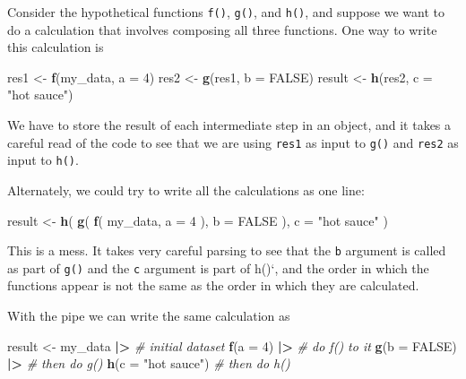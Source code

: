 \documentclass[
]{book}
\newenvironment{Shaded}{\begin{snugshade}}{\end{snugshade}}
\newcommand{\AttributeTok}[1]{\textcolor[rgb]{0.13,0.29,0.53}{#1}}
\newcommand{\CommentTok}[1]{\textcolor[rgb]{0.56,0.35,0.01}{\textit{#1}}}
\newcommand{\ConstantTok}[1]{\textcolor[rgb]{0.56,0.35,0.01}{#1}}
\newcommand{\DecValTok}[1]{\textcolor[rgb]{0.00,0.00,0.81}{#1}}
\newcommand{\FunctionTok}[1]{\textcolor[rgb]{0.13,0.29,0.53}{\textbf{#1}}}
\newcommand{\NormalTok}[1]{#1}
\newcommand{\OtherTok}[1]{\textcolor[rgb]{0.56,0.35,0.01}{#1}}
\newcommand{\SpecialCharTok}[1]{\textcolor[rgb]{0.81,0.36,0.00}{\textbf{#1}}}
\newcommand{\StringTok}[1]{\textcolor[rgb]{0.31,0.60,0.02}{#1}}
\begin{document}
Consider the hypothetical functions \texttt{f()}, \texttt{g()}, and \texttt{h()}, and suppose we want to do a calculation that involves composing all three functions.
One way to write this calculation is

\begin{Shaded}
\begin{Highlighting}[]
\NormalTok{res1 }\OtherTok{\textless{}{-}} \FunctionTok{f}\NormalTok{(my\_data, }\AttributeTok{a =} \DecValTok{4}\NormalTok{)}
\NormalTok{res2 }\OtherTok{\textless{}{-}} \FunctionTok{g}\NormalTok{(res1, }\AttributeTok{b =} \ConstantTok{FALSE}\NormalTok{)}
\NormalTok{result }\OtherTok{\textless{}{-}} \FunctionTok{h}\NormalTok{(res2, }\AttributeTok{c =} \StringTok{"hot sauce"}\NormalTok{)}
\end{Highlighting}
\end{Shaded}

We have to store the result of each intermediate step in an object, and it takes a careful read of the code to see that we are using \texttt{res1} as input to \texttt{g()} and \texttt{res2} as input to \texttt{h()}.

Alternately, we could try to write all the calculations as one line:

\begin{Shaded}
\begin{Highlighting}[]
\NormalTok{result }\OtherTok{\textless{}{-}} \FunctionTok{h}\NormalTok{( }\FunctionTok{g}\NormalTok{( }\FunctionTok{f}\NormalTok{( my\_data, }\AttributeTok{a =} \DecValTok{4}\NormalTok{ ), }\AttributeTok{b =} \ConstantTok{FALSE}\NormalTok{ ), }\AttributeTok{c =} \StringTok{"hot sauce"}\NormalTok{ )}
\end{Highlighting}
\end{Shaded}

This is a mess. It takes very careful parsing to see that the \texttt{b} argument is called as part of \texttt{g()} and the \texttt{c} argument is part of h()`, and the order in which the functions appear is not the same as the order in which they are calculated.

With the pipe we can write the same calculation as

\begin{Shaded}
\begin{Highlighting}[]
\NormalTok{result }\OtherTok{\textless{}{-}} 
\NormalTok{  my\_data }\SpecialCharTok{|\textgreater{}}         \CommentTok{\# initial dataset}
  \FunctionTok{f}\NormalTok{(}\AttributeTok{a =} \DecValTok{4}\NormalTok{) }\SpecialCharTok{|\textgreater{}}        \CommentTok{\# do f() to it}
  \FunctionTok{g}\NormalTok{(}\AttributeTok{b =} \ConstantTok{FALSE}\NormalTok{) }\SpecialCharTok{|\textgreater{}}    \CommentTok{\# then do g()}
  \FunctionTok{h}\NormalTok{(}\AttributeTok{c =} \StringTok{"hot sauce"}\NormalTok{) }\CommentTok{\# then do h()}
\end{Highlighting}
\end{Shaded}
\end{document}
